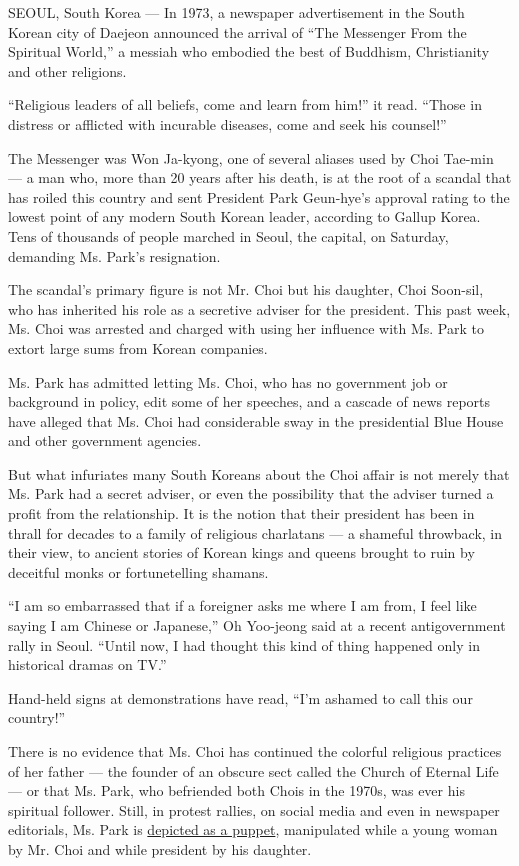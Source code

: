 SEOUL, South Korea --- In 1973, a newspaper advertisement in the South
Korean city of Daejeon announced the arrival of ``The Messenger From the
Spiritual World,'' a messiah who embodied the best of Buddhism,
Christianity and other religions.

``Religious leaders of all beliefs, come and learn from him!'' it read.
``Those in distress or afflicted with incurable diseases, come and seek
his counsel!''

The Messenger was Won Ja-kyong, one of several aliases used by Choi
Tae-min --- a man who, more than 20 years after his death, is at the
root of a scandal that has roiled this country and sent President Park
Geun-hye's approval rating to the lowest point of any modern South
Korean leader, according to Gallup Korea. Tens of thousands of people
marched in Seoul, the capital, on Saturday, demanding Ms. Park's
resignation.

The scandal's primary figure is not Mr. Choi but his daughter, Choi
Soon-sil, who has inherited his role as a secretive adviser for the
president. This past week, Ms. Choi was arrested and charged with using
her influence with Ms. Park to extort large sums from Korean companies.

Ms. Park has admitted letting Ms. Choi, who has no government job or
background in policy, edit some of her speeches, and a cascade of news
reports have alleged that Ms. Choi had considerable sway in the
presidential Blue House and other government agencies.

But what infuriates many South Koreans about the Choi affair is not
merely that Ms. Park had a secret adviser, or even the possibility that
the adviser turned a profit from the relationship. It is the notion that
their president has been in thrall for decades to a family of religious
charlatans --- a shameful throwback, in their view, to ancient stories
of Korean kings and queens brought to ruin by deceitful monks or
fortunetelling shamans.

``I am so embarrassed that if a foreigner asks me where I am from, I
feel like saying I am Chinese or Japanese,'' Oh Yoo-jeong said at a
recent antigovernment rally in Seoul. ``Until now, I had thought this
kind of thing happened only in historical dramas on TV.''

Hand-held signs at demonstrations have read, ``I'm ashamed to call this
our country!''

There is no evidence that Ms. Choi has continued the colorful religious
practices of her father --- the founder of an obscure sect called the
Church of Eternal Life --- or that Ms. Park, who befriended both Chois
in the 1970s, was ever his spiritual follower. Still, in protest
rallies, on social media and even in newspaper editorials, Ms. Park is
\href{https://www.youtube.com/watch?v=JmwlA7O96NM}{depicted as a
puppet}, manipulated while a young woman by Mr. Choi and while president
by his daughter.


